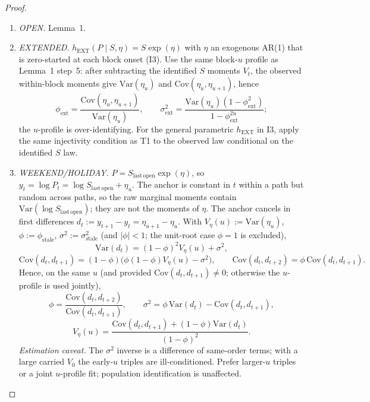 \begin{proof}
\begin{enumerate}
\item \emph{OPEN.}  Lemma~1.
\item \emph{EXTENDED.}  $h_{\mathrm{EXT}}(P\mid S,\eta)=S\exp(\eta)$ with $\eta$
an exogenous AR(1) that is zero-started at each block onset (I3).  Use the same
block-$u$ profile as Lemma~1 step~5: after subtracting the identified $S$
moments $V_t$, the observed within-block moments give $\mathrm{Var}(\eta_u)$ and
$\mathrm{Cov}(\eta_u,\eta_{u+1})$, hence
\[
\phi_{\mathrm{ext}}
=\frac{\mathrm{Cov}(\eta_u,\eta_{u+1})}{\mathrm{Var}(\eta_u)},
\qquad
\sigma_{\mathrm{ext}}^2
=\frac{\mathrm{Var}(\eta_u)(1-\phi_{\mathrm{ext}}^2)}
{1-\phi_{\mathrm{ext}}^{2u}};
\]
the $u$-profile is over-identifying.  For the general parametric
$h_{\mathrm{EXT}}$ in I3, apply the same injectivity condition as T1 to the
observed law conditional on the identified $S$ law.
\item \emph{WEEKEND/HOLIDAY.}  $P=S_{\mathrm{last\,open}}\exp(\eta)$, so
$y_t=\log P_t=\log S_{\mathrm{last\,open}}+\eta_u$.  The anchor is constant in
$t$ within a path but random across paths, so the raw marginal moments contain
$\mathrm{Var}(\log S_{\mathrm{last\,open}})$; they are not the moments of
$\eta$.  The anchor cancels in first differences
$d_t:=y_{t+1}-y_t=\eta_{u+1}-\eta_u$.  With
$V_\eta(u):=\mathrm{Var}(\eta_u)$, $\phi:=\phi_{\mathrm{stale}}$,
$\sigma^2:=\sigma_{\mathrm{stale}}^2$ (and $|\phi|<1$; the unit-root case
$\phi=1$ is excluded),
\[
\mathrm{Var}(d_t)=(1-\phi)^2V_\eta(u)+\sigma^2,
\]
\[
\mathrm{Cov}(d_t,d_{t+1})
=(1-\phi)\bigl(\phi(1-\phi)V_\eta(u)-\sigma^2\bigr),
\qquad
\mathrm{Cov}(d_t,d_{t+2})=\phi\,\mathrm{Cov}(d_t,d_{t+1}).
\]
Hence, on the same $u$ (and provided
$\mathrm{Cov}(d_t,d_{t+1})\ne0$; otherwise the $u$-profile is used jointly),
\[
\phi=\frac{\mathrm{Cov}(d_t,d_{t+2})}{\mathrm{Cov}(d_t,d_{t+1})},
\qquad
\sigma^2=\phi\,\mathrm{Var}(d_t)-\mathrm{Cov}(d_t,d_{t+1}),
\]
\[
V_\eta(u)
=\frac{\mathrm{Cov}(d_t,d_{t+1})+(1-\phi)\mathrm{Var}(d_t)}
{(1-\phi)^2}.
\]
\emph{Estimation caveat.}  The $\sigma^2$ inverse is a difference of same-order
terms; with a large carried $V_0$ the early-$u$ triples are ill-conditioned.
Prefer larger-$u$ triples or a joint $u$-profile fit; population identification
is unaffected.


\end{enumerate}
\end{proof}

